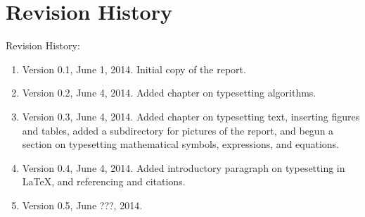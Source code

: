 






\chapter*{Revision History}
\label{chp:revisionhistory}


Revision History: \vspace{-0.3cm}
\begin{enumerate} \itemsep -4pt
\item Version 0.1, June 1, 2014. Initial copy of the report.
\item Version 0.2, June 4, 2014. Added chapter on typesetting algorithms.
\item Version 0.3, June 4, 2014. Added chapter on typesetting text, inserting figures and tables, added a subdirectory for pictures of the report, and begun a section on typesetting mathematical symbols, expressions, and equations.
\item Version 0.4, June 4, 2014. Added introductory paragraph on typesetting in \LaTeX, and referencing and citations.
\item Version 0.5, June ???, 2014.
\end{enumerate}


